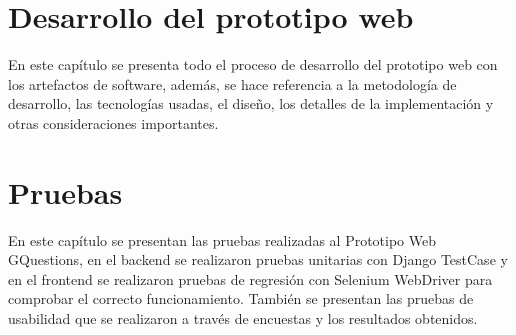 \documentclass[spanish, a4paper, 12pt, twoside, openany]{book}
\numberwithin{equation}{section} %
\begin{document}





\clearpage

\chapter{Desarrollo del prototipo web}
\minitoc%

\begin{justify}
En este capítulo se presenta todo el proceso de desarrollo del prototipo web con los artefactos de software, además, se hace referencia a la metodología de desarrollo, las tecnologías usadas, el diseño, los detalles de la implementación y otras consideraciones importantes.  
\end{justify}






\clearpage

\chapter{Pruebas}
\minitoc%
\begin{justify}
En este capítulo se presentan las pruebas realizadas al Prototipo Web GQuestions, en el backend se realizaron pruebas unitarias con Django TestCase y en el frontend se realizaron pruebas de regresión con Selenium WebDriver para comprobar el correcto funcionamiento. También se presentan las pruebas de usabilidad que se realizaron a través de encuestas y los resultados obtenidos.
\end{justify}







\clearpage
\end{document}
